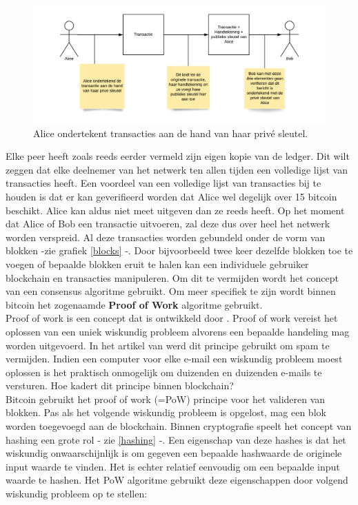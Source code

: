 \begin{figure}[h!]
	\centering
		\includegraphics[scale=0.4]{blockchain-2.png}
	\caption[Blockchain - Voorstelling 2]{Alice ondertekent transacties aan de hand van haar privé sleutel.}
\end{figure}

Elke peer heeft zoals reeds eerder vermeld zijn eigen kopie van de ledger. Dit wilt zeggen dat elke deelnemer van het netwerk ten allen tijden een volledige lijst van transacties heeft. Een voordeel van een volledige lijst van transacties bij te houden is dat er kan geverifieerd worden dat Alice wel degelijk over 15 bitcoin beschikt. Alice kan aldus niet meet uitgeven dan ze reeds heeft. Op het moment dat Alice of Bob een transactie uitvoeren, zal deze dus over heel het netwerk worden verspreid.  Al deze transacties worden gebundeld onder de vorm van blokken -zie grafiek \ref{blocks} -. Door bijvoorbeeld twee keer dezelfde blokken toe te voegen of bepaalde blokken eruit te halen kan een individuele gebruiker blockchain en transacties manipuleren.  Om dit te vermijden wordt het concept van een consensus algoritme gebruikt. Om meer specifiek te zijn wordt binnen bitcoin het zogenaamde \textbf{Proof of Work} algoritme gebruikt.\\

Proof of work is een concept dat is ontwikkeld door \textcite{Dwork}. Proof of work vereist het oplossen van een uniek wiskundig probleem alvorens een bepaalde handeling mag worden uitgevoerd. In het artikel van \textcite{Dwork} werd dit principe gebruikt om spam te vermijden. Indien een computer voor elke e-mail een wiskundig probleem moest oplossen is het praktisch onmogelijk om duizenden en duizenden e-mails te versturen. Hoe kadert dit principe binnen blockchain?\\

Bitcoin gebruikt het proof of work (=PoW) principe voor het valideren van blokken. Pas als het volgende wiskundig probleem is opgelost, mag een blok worden toegevoegd aan de blockchain. Binnen cryptografie speelt het concept van hashing een grote rol - zie \ref{hashing} -. Een eigenschap van deze hashes is dat het wiskundig onwaarschijnlijk is om gegeven een bepaalde hashwaarde de originele input waarde te vinden. Het is echter relatief eenvoudig om een bepaalde input waarde te hashen. Het PoW algoritme gebruikt deze eigenschappen door volgend wiskundig probleem op te stellen:\\

